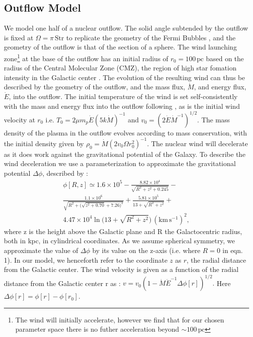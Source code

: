 \documentclass[a4paper,fleqn,usenatbib]{mnras}
\begin{document}
\subsection{Outflow Model}
We model one half of a nuclear outflow. The solid angle subtended by the outflow is fixed at $\Omega = \pi\,\mathrm{Str}$ to replicate the geometry of the Fermi Bubbles \citep{Lacki2014}, and the geometry of the outflow is that of the section of a sphere. The wind launching zone\footnote{The wind will initially accelerate, however we find that for our chosen parameter space there is no futher acceleration beyond $\sim 100\,\mathrm{pc}$} at the base of the outflow has an initial radius of $r_0 = 100\,\mathrm{pc}$ based on the radius of the Central Molecular Zone (CMZ), the region of high star fomation intensity in the Galactic center \citep{Morris96}. The evolution of the resulting wind can thus be described by the geometry of the outflow, and the mass flux, $\dot{M}$, and energy flux, $\dot{E}$, into the outflow. The initial temperature of the wind is set self-consistently with the mass and energy flux into the outflow following \cite{Strickland09}, as is the initial wind velocity at $r_0$ i.e. $T_0 = 2\mu m_p \dot{E}(5 k \dot{M})^{-1}$ and $v_0=(2\dot{E}\dot{M}^{-1})^{1/2}$. The mass density of the plasma in the outflow evolves according to mass conservation, with the initial density given by $\rho_0 =\dot{M}(2v_0\Omega r_0^2)^{-1}.$ The nuclear wind will decelerate as it does work against the gravitational potential of the Galaxy. To describe the wind deceleration we use a parameterization to approximate the gravitational potential $\Delta\phi$, described by \cite{Breitschwerdt91}: 
\begin{multline}
\phi [R, z] \simeq 1.6 \times 10^5 - \frac{8.82\times 10^4}{\sqrt{R^2+z^2+0.245}}-\\\frac{1.1\times 10^6}{\sqrt{R^2+\bigg(\sqrt{z^2+0.70}+7.26\bigg)^2}}+\frac{5.81\times10^5}{13+\sqrt{R^2+z^2}}+\\4.47\times10^4\ln\bigg({13+\sqrt{R^2+z^2}}\bigg)\,\mathrm{(km\,s^{-1})^2},
\end{multline}
where z is the height above the Galactic plane and R the Galactocentric radius, both in kpc, in cylindrical coordinates. As we assume spherical symmetry, we approximate the value of  $\Delta\phi$ by its value on the z-axis (i.e. where $R=0$ in eqn. 1). In our model, we henceforth refer to the coordinate $z$ as $r$, the radial distance from the Galactic center. The wind velocity is given as a function of the radial distance from the Galactic center r as \citep{Crocker15}: $v = v_0(1-\dot{M}\dot{E}^{-1}\Delta\phi[r])^{1/2}.$ Here $\Delta\phi[r] = \phi[r]-\phi[r_0]$.\\
\end{document}
